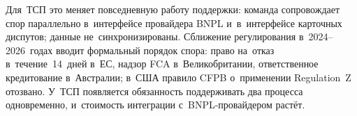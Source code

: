 Для~ТСП это меняет повседневную работу поддержки: команда сопровождает спор
параллельно в~интерфейсе провайдера BNPL и~в~интерфейсе карточных диспутов;
данные не~синхронизированы. Сближение регулирования в~2024--2026~годах вводит
формальный порядок спора: право на~отказ в~течение~14~дней в~ЕС, надзор FCA
в~Великобритании, ответственное кредитование в~Австралии; в~США правило CFPB
о~применении Regulation~Z отозвано.
У~ТСП появляется обязанность поддерживать два процесса одновременно,
и~стоимость интеграции с~BNPL-провайдером растёт.

